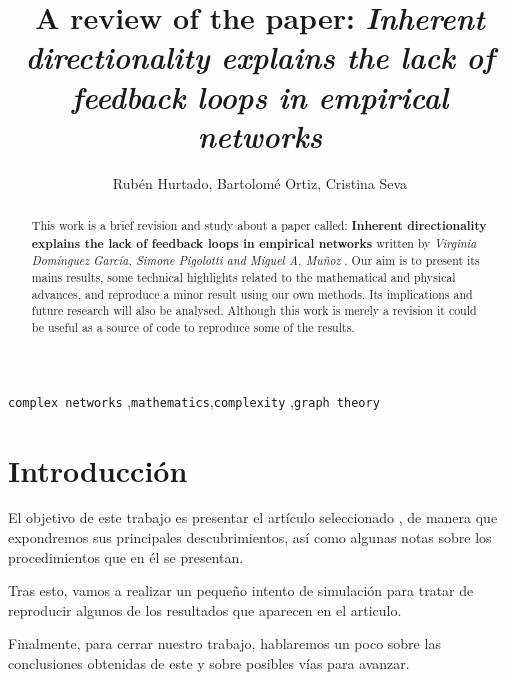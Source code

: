 \documentclass[1p]{elsarticle}
\begin{document}
\begin{frontmatter}

\title{A review of the paper: \textit{Inherent directionality explains the lack of feedback loops in
	empirical networks} }

\author{Rubén Hurtado, Bartolomé Ortiz, Cristina Seva}
\address{Master en Física y Matemáticas\\ Universidad de Granada\\10/06/2018}

\begin{abstract}
This work is a brief revision and study about a paper called: \textbf{Inherent directionality explains the lack of feedback loops in empirical networks} written by \textit{Virginia Domínguez García, Simone Pigolotti and Miguel A. Muñoz}  . Our aim is to present its mains results, some technical highlights related to the mathematical and physical advances, and reproduce a minor result using our own methods. Its implications and future research will also be analysed. Although this work is merely a revision it could be useful as a source of code to reproduce some of the results.
\end{abstract}

\begin{keyword}
 \texttt{complex networks} \sep \texttt{mathematics}\sep \texttt{complexity} \sep \texttt{graph theory}
\end{keyword}

\end{frontmatter}
\setlength\parindent{0pt}
\linenumbers

\section{Introducción}
El objetivo de este trabajo es presentar el artículo seleccionado \cite{arti}, de manera que expondremos sus principales descubrimientos, así como algunas notas sobre los procedimientos que en él se presentan. 

Tras esto, vamos a realizar un pequeño intento de simulación para tratar de reproducir algunos de los resultados que aparecen en el articulo.

Finalmente, para cerrar nuestro trabajo, hablaremos un poco sobre las conclusiones obtenidas de este y sobre posibles vías para avanzar.
\end{document}
